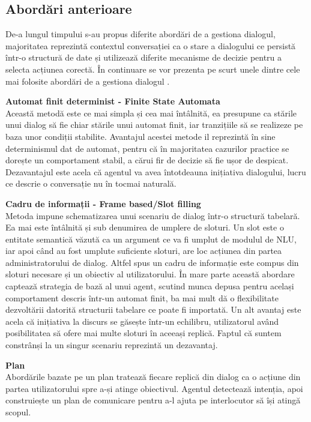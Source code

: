 \subsection{Abordări anterioare}

De-a lungul timpului s-au propus diferite abordări de a gestiona dialogul, majoritatea reprezintă contextul conversației ca o stare a dialogului ce persistă într-o structură de date și utilizează diferite mecanisme de decizie pentru a selecta acțiunea corectă. În continuare se vor prezenta pe scurt unele dintre cele mai folosite abordări de a gestiona dialogul \cite{aniklasson, dm-framework}.

\textbf{Automat finit determinist - Finite State Automata}\\
Această metodă este ce mai simpla și cea mai întâlnită, ea presupune ca stările unui dialog să fie chiar stările unui automat finit, iar tranzițiile să se realizeze pe baza unor condiții stabilite. Avantajul acestei metode il reprezintă în sine determinismul dat de automat, pentru că în majoritatea cazurilor practice se dorește un comportament stabil, a cărui fir de decizie să fie ușor de despicat. Dezavantajul este acela că agentul va avea întotdeauna inițiativa dialogului, lucru ce descrie o conversație nu în tocmai naturală.
	
\textbf{Cadru de informații - Frame based/Slot filling}\\
Metoda impune schematizarea unui scenariu de dialog într-o structură tabelară. Ea mai este întâlnită și sub denumirea de umplere de sloturi. Un slot este o entitate semantică văzută ca un argument ce va fi umplut de modulul de NLU, iar apoi când au fost umplute suficiente sloturi, are loc acțiunea din partea administratorului de dialog. Altfel spus un cadru de informație este compus din sloturi necesare și un obiectiv al utilizatorului. În mare parte această abordare captează strategia de bază al unui agent, scutind munca depusa pentru același comportament descris într-un automat finit, ba mai mult dă o flexibilitate dezvoltării datorită structurii tabelare ce poate fi importată. Un alt avantaj este acela că inițiativa la discurs se găsește într-un echilibru, utilizatorul având posibilitatea să ofere mai multe sloturi în aceeași replică. Faptul că suntem constrânși la un singur scenariu reprezintă un dezavantaj.

\textbf{Plan}\\
Abordările bazate pe un plan tratează fiecare replică din dialog ca o acțiune din partea utilizatorului spre a-și atinge obiectivul. Agentul detectează intenția, apoi construiește un plan de comunicare pentru a-l ajuta pe interlocutor să își atingă scopul.

